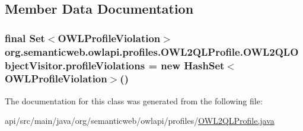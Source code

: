 \subsection{Member Data Documentation}
\hypertarget{classorg_1_1semanticweb_1_1owlapi_1_1profiles_1_1_o_w_l2_q_l_profile_1_1_o_w_l2_q_l_object_visitor_a69a5f073271112b4ee6a3ebc7f596d71}{
\subsubsection[{profile\-Violations}]{\setlength{\rightskip}{0pt plus 5cm}final Set$<${\bf O\-W\-L\-Profile\-Violation}$>$ org.\-semanticweb.\-owlapi.\-profiles.\-O\-W\-L2\-Q\-L\-Profile.\-O\-W\-L2\-Q\-L\-Object\-Visitor.\-profile\-Violations = new Hash\-Set$<${\bf O\-W\-L\-Profile\-Violation}$>$()\hspace{0.3cm}{\ttfamily [private]}}}\label{classorg_1_1semanticweb_1_1owlapi_1_1profiles_1_1_o_w_l2_q_l_profile_1_1_o_w_l2_q_l_object_visitor_a69a5f073271112b4ee6a3ebc7f596d71}


The documentation for this class was generated from the following file\-:\begin{DoxyCompactItemize}
\item 
api/src/main/java/org/semanticweb/owlapi/profiles/\hyperlink{_o_w_l2_q_l_profile_8java}{O\-W\-L2\-Q\-L\-Profile.\-java}\end{DoxyCompactItemize}
